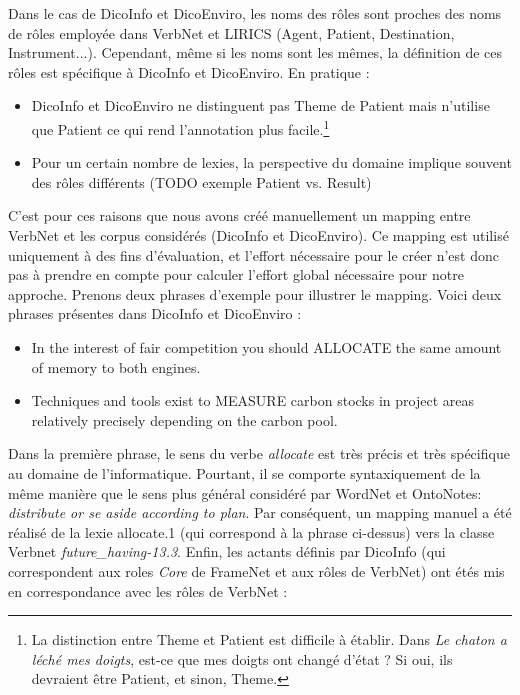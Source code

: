 Dans le cas de DicoInfo et DicoEnviro, les noms des rôles sont proches des noms
de rôles employée dans VerbNet et LIRICS \citep{bonial2011hierarchical} (Agent,
Patient, Destination, Instrument...). Cependant, même si les noms sont les
mêmes, la définition de ces rôles est spécifique à DicoInfo et DicoEnviro.
En pratique :

\begin{itemize}
    \item DicoInfo et DicoEnviro ne distinguent pas Theme de Patient mais
    n'utilise que Patient ce qui rend l'annotation plus facile.\footnote{La
    distinction entre Theme et Patient est difficile à établir. Dans \textit{Le
    chaton a léché mes doigts}, est-ce que mes doigts ont changé d'état ? Si oui,
    ils devraient être Patient, et sinon, Theme.\citep[p.~5]{palmer2010semantic}}
    \item Pour un certain nombre de lexies, la perspective du domaine implique
    souvent des rôles différents (TODO exemple Patient vs. Result) %
\end{itemize}

C'est pour ces raisons que nous avons créé manuellement un mapping entre
VerbNet et les corpus considérés (DicoInfo et DicoEnviro). Ce mapping est
utilisé uniquement à des fins d'évaluation, et l'effort nécessaire pour le
créer n'est donc pas à prendre en compte pour calculer l'effort global
nécessaire pour notre approche. Prenons deux phrases d'exemple pour illustrer
le mapping. Voici deux phrases présentes dans DicoInfo et DicoEnviro :

\begin{itemize}
    \item In the interest of fair competition you should ALLOCATE the same amount of memory to both engines.
    \item Techniques and tools exist to MEASURE carbon stocks in project areas relatively precisely depending on the carbon pool.
\end{itemize}

Dans la première phrase, le sens du verbe \textit{allocate} est très précis et
très spécifique au domaine de l'informatique. Pourtant, il se comporte
syntaxiquement de la même manière que le sens plus général considéré par
WordNet et OntoNotes: \textit{distribute or se aside according to plan}. Par
conséquent, un mapping manuel a été réalisé de la lexie allocate.1 (qui
correspond à la phrase ci-dessus) vers la classe Verbnet
\textit{future\_having-13.3}. Enfin, les actants définis par DicoInfo (qui
correspondent aux roles \textit{Core} de FrameNet et aux rôles de VerbNet) ont
étés mis en correspondance avec les rôles de VerbNet :

